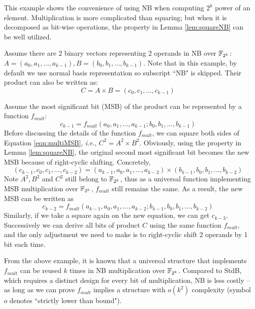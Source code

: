 This example shows the convenience of using NB when computing $2^k$ power of an element.
Multiplication is more complicated than squaring; but when it is decomposed as bit-wise
operations, the property in Lemma \ref{lem:squareNB} can be well utilized.

\begin{Example}
Assume there are 2 binary vectors representing 2 operands in NB over ${\mathbb{F}}_{2^k}$: 
$A = (a_0, a_1, \dots, a_{k-1}), B = (b_0, b_1, \dots, b_{k-1})$. Note that in this example, 
by default we use normal basis representation so subscript ``NB" is skipped. Their product can also be written
as: $$C = A\times B = (c_0, c_1, \dots, c_{k-1})$$

Assume the most significant bit (MSB) of the product can be represented by a function $f_{mult}$: 
\begin{equation}
\label{eqn:multiMSB}
c_{k-1} = f_{mult}(a_0, a_1, \dots, a_{k-1}; b_0, b_1, \dots, b_{k-1})
\end{equation}
Before discussing the details of the function $f_{mult}$, we can 
square both sides of Equation \ref{eqn:multiMSB}, {\it i.e.}, $C^2 = A^2\times B^2$.
Obviously, using the property in Lemma \ref{lem:squareNB}, the original second most significant bit 
becomes the new MSB because of right-cyclic shifting. 
Concretely, 
$$(c_{k-1},c_0,c_1,\dots,c_{k-2}) = (a_{k-1},a_0,a_1,\dots,a_{k-2})\times(b_{k-1},b_0,b_1,\dots,b_{k-2})$$
Note $A^2, B^2$ and $C^2$ still belong to ${\mathbb{F}}_{2^k}$, thus as a universal function implementing MSB multiplication
over ${\mathbb{F}}_{2^k}$, $f_{mult}$ still remains the same. As a result, the new MSB can be written as 
\begin{equation}
\label{eqn:shiftMSB}
c_{k-2} = f_{mult}(a_{k-1}, a_0, a_1, 
\dots, a_{k-2}; b_{k-1}, b_0, b_1, \dots, b_{k-2})
\end{equation}
Similarly, if we take a square again on the new equation, we can get $c_{k-3}$.
Successively we can derive all bits of product $C$ using the same function $f_{mult}$, and the only
adjustment we need to make is to right-cyclic shift 2 operands by 1 bit each time.
\end{Example}

From the above example, it is known that a universal structure that implements $f_{mult}$ can be reused
$k$ times in NB multiplication over ${\mathbb{F}}_{2^k}$. Compared to StdB, which requires a distinct design 
for every bit of multiplication, NB is less costly -- as long as we can prove $f_{mult}$ implies 
a structure with $o(k^2)$ complexity (symbol $o$ denotes ``strictly lower than bound"). 

